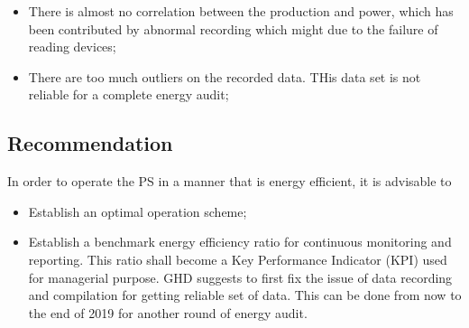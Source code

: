 \begin{itemize}
	\item There is almost no correlation between the production and power, which has been contributed by abnormal recording which might due to the failure of reading devices;
	\item There are too much outliers on the recorded data. THis data set is not reliable for a complete energy audit;
	
\end{itemize}

\subsection{Recommendation}
In order to operate the PS in a manner that is energy efficient, it is advisable to 

\begin{itemize}
\item Establish an optimal operation scheme;
\item Establish a benchmark energy efficiency ratio for continuous monitoring and reporting. This ratio shall become a Key Performance Indicator (KPI) used for managerial purpose. GHD suggests to first fix the issue of data recording and compilation for getting reliable set of data. This can be done from now to the end of 2019 for another round of energy audit.
\end{itemize}
